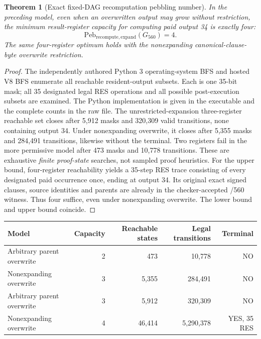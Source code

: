 \documentclass[11pt]{article}
\newtheorem{theorem}{Theorem}
\begin{document}
\begin{theorem}[Exact fixed-DAG recomputation pebbling number]
In the preceding model, even when an overwritten output may grow without restriction, the minimum result-register capacity for computing paid output 34 is exactly four:
\[
\boxed{\mathrm{Peb}_{\mathrm{recompute,expand}}(G_{560})=4}.
\]
The same four-register optimum holds with the nonexpanding canonical-clause-byte overwrite restriction.
\end{theorem}
\begin{proof}
The independently authored Python 3 operating-system BFS and hosted V8 BFS enumerate all reachable resident-output subsets. Each is one 35-bit mask; all 35 designated legal RES operations and all possible post-execution subsets are examined. The Python implementation is given in the executable and the complete counts in the raw file. The unrestricted-expansion three-register reachable set closes after 5,912 masks and 320,309 valid transitions, none containing output 34. Under nonexpanding overwrite, it closes after 5,355 masks and 284,491 transitions, likewise without the terminal. Two registers fail in the more permissive model after 473 masks and 10,778 transitions. These are exhaustive \emph{finite proof-state} searches, not sampled proof heuristics. For the upper bound, four-register reachability yields a 35-step RES trace consisting of every designated paid occurrence once, ending at output 34. Its original exact signed clauses, source identities and parents are already in the checker-accepted /560 witness. Thus four suffice, even under nonexpanding overwrite. The lower bound and upper bound coincide.
\end{proof}

\begin{center}
\begin{tabular}{@{}lrrrr@{}}
\toprule
Model & Capacity & Reachable states & Legal transitions & Terminal\\
\midrule
Arbitrary parent overwrite & 2 & 473 & 10,778 & NO\\
Nonexpanding overwrite & 3 & 5,355 & 284,491 & NO\\
Arbitrary parent overwrite & 3 & 5,912 & 320,309 & NO\\
Nonexpanding overwrite & 4 & 46,414 & 5,290,378 & YES, 35 RES\\
\bottomrule
\end{tabular}
\end{center}
\end{document}

